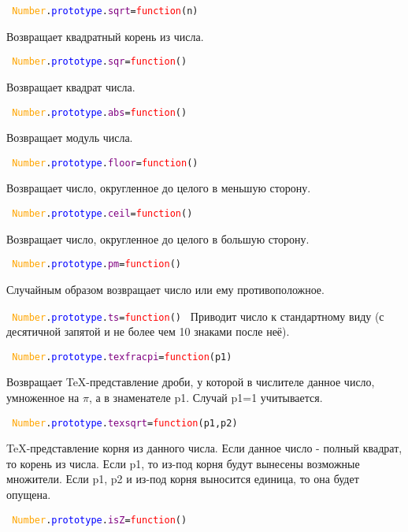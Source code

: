 \texttt{
	\textcolor{Orange}{Number}.\textcolor{Blue}{prototype}.\textcolor{Purple}{sqrt}=\textcolor{Red}{function}(n)
}

Возвращает квадратный корень из числа.

\texttt{
	\textcolor{Orange}{Number}.\textcolor{Blue}{prototype}.\textcolor{Purple}{sqr}=\textcolor{Red}{function}()
}

Возвращает квадрат числа.

\texttt{
	\textcolor{Orange}{Number}.\textcolor{Blue}{prototype}.\textcolor{Purple}{abs}=\textcolor{Red}{function}()
}

Возвращает модуль числа.

\texttt{
	\textcolor{Orange}{Number}.\textcolor{Blue}{prototype}.\textcolor{Purple}{floor}=\textcolor{Red}{function}()
}

Возвращает число, округленное до целого в меньшую сторону.

\texttt{
	\textcolor{Orange}{Number}.\textcolor{Blue}{prototype}.\textcolor{Purple}{ceil}=\textcolor{Red}{function}()
}

Возвращает число, округленное до целого в большую сторону.

\texttt{
	\textcolor{Orange}{Number}.\textcolor{Blue}{prototype}.\textcolor{Purple}{pm}=\textcolor{Red}{function}()
}

Случайным образом возвращает число или ему противоположное.

\texttt{
	\textcolor{Orange}{Number}.\textcolor{Blue}{prototype}.\textcolor{Purple}{ts}=\textcolor{Red}{function}()
}
Приводит число к стандартному виду (с десятичной запятой и не более чем 10 знаками после неё).

\texttt{
	\textcolor{Orange}{Number}.\textcolor{Blue}{prototype}.\textcolor{Purple}{texfracpi}=\textcolor{Red}{function}(p1)
}

Возвращает TeX-представление дроби, у которой в числителе данное число, умноженное на $\pi$, а в знаменателе p1.
Случай p1=1 учитывается.

\texttt{
	\textcolor{Orange}{Number}.\textcolor{Blue}{prototype}.\textcolor{Purple}{texsqrt}=\textcolor{Red}{function}(p1,p2)
}

TeX-представление корня из данного числа.
Если данное число - полный квадрат, то корень из числа.
Если p1, то из-под корня будут вынесены возможные множители.
Если p1, p2 и из-под корня выносится единица, то она будет опущена.

\texttt{
	\textcolor{Orange}{Number}.\textcolor{Blue}{prototype}.\textcolor{Purple}{isZ}=\textcolor{Red}{function}()
}

